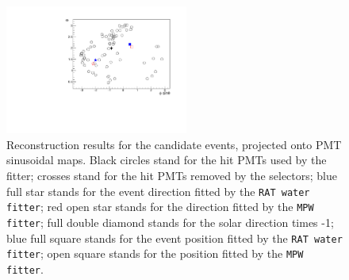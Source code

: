 \begin{figure}[htbp]
{\begin{minipage}[t]{0.4\textwidth}
			\centering
			\includegraphics[width=6cm]{PMTmap_100663.pdf}
		\end{minipage}
	}
	\caption[Reconstruction results for the candidate events, projected onto PMT sinusoidal maps.]{Reconstruction results for the candidate events, projected onto PMT sinusoidal maps. Black circles stand for the hit PMTs used by the fitter; crosses stand for the hit PMTs removed by the selectors; blue full star stands for the event direction fitted by the \texttt{RAT water fitter}; red open star stands for the direction fitted by the \texttt{MPW fitter}; full double diamond stands for the solar direction times -1; blue full square stands for the event position fitted by the \texttt{RAT water fitter}; open square stands for the position fitted by the \texttt{MPW fitter}.	\label{fig:openDataSetCandidate}}
\end{figure}


